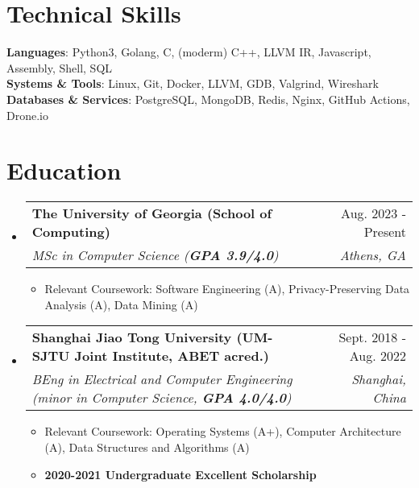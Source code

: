 \documentclass[letterpaper,11pt]{article}
\makeatletter
\newcommand{\resumeItem}[1]{
  \item\small{
    {#1 \vspace{-2pt}}
  }
}
\newcommand{\resumeSubHeader}[4]{
  \vspace{-2pt}\item
    \begin{tabular*}{0.98\textwidth}[t]{l@{\extracolsep{\fill}}r}
      \textbf{#1} & #2 \\
      \textit{\small#3} & \textit{\small #4} \\
    \end{tabular*}\vspace{-7pt}
}
\newcommand{\resumeSubHeaderListStart}{\begin{itemize}[leftmargin=0.15in, label={}]}
\newcommand{\resumeSubHeaderListEnd}{\end{itemize}}
\newcommand{\resumeItemListStart}{\begin{itemize}}
\newcommand{\resumeItemListEnd}{\end{itemize}\vspace{-5pt}}
\makeatother
\begin{document}
\section{Technical Skills}
 \begin{itemize}[leftmargin=0.15in, label={}]
    \small{
      \item{
     \textbf{Languages}{: Python3, Golang, C, (moderm) C++, LLVM IR, Javascript, Assembly, Shell, SQL} \\
     \textbf{Systems \& Tools}{: Linux, Git, Docker, LLVM, GDB, Valgrind, Wireshark} \\
     \textbf{Databases \& Services}{: PostgreSQL, MongoDB, Redis, Nginx, GitHub Actions, Drone.io}
    }}
 \end{itemize}

\section{Education}
  \resumeSubHeaderListStart
    \resumeSubHeader
      {The University of Georgia (School of Computing)}{Aug. 2023 - Present}
      {MSc in Computer Science (\textbf{GPA 3.9/4.0})}{Athens, GA}
      \resumeItemListStart
        \resumeItem{Relevant Coursework: Software Engineering (A), Privacy-Preserving Data Analysis (A), Data Mining (A)}
      \resumeItemListEnd
    \resumeSubHeader
      {Shanghai Jiao Tong University (UM-SJTU Joint Institute, ABET acred.)}{Sept. 2018 - Aug. 2022}
      {BEng in Electrical and Computer Engineering (minor in Computer Science, \textbf{GPA 4.0/4.0})}{Shanghai, China}
      \resumeItemListStart
        \resumeItem{Relevant Coursework: Operating Systems (A+), Computer Architecture (A), Data Structures and Algorithms (A)}
        \resumeItem{\textbf{2020-2021 Undergraduate Excellent Scholarship}}
      \resumeItemListEnd
  \resumeSubHeaderListEnd
\end{document}
